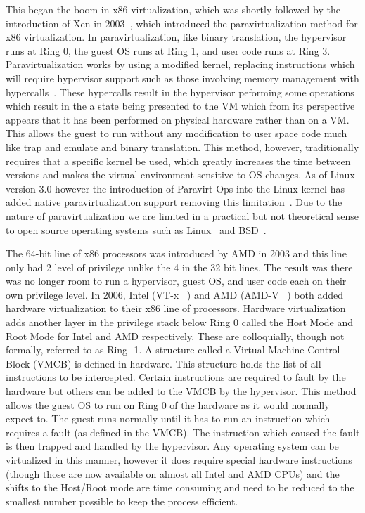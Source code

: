This began the boom in x86 virtualization, which was shortly followed by the introduction of Xen in 2003~\cite{barham_xen_2003}, which introduced the paravirtualization method for x86 virtualization. In paravirtualization, like binary translation, the hypervisor runs at Ring 0, the guest OS runs at Ring 1, and user code runs at Ring 3.  Paravirtualization works by using a modified kernel, replacing instructions which will require hypervisor support such as those involving memory management with hypercalls~\cite{barham_xen_2003}.  These hypercalls result in the hypervisor peforming some operations which result in the a state being presented to the VM which from its perspective appears that it has been performed on physical hardware rather than on a VM. This allows the guest to run without any modification to user space code much like trap and emulate and binary translation. This method, however, traditionally requires that a specific kernel be used, which greatly increases the time between versions and makes the virtual environment sensitive to OS changes. As of Linux version 3.0 however the introduction of Paravirt Ops into the Linux kernel has added native paravirtualization support removing this limitation~\cite{_understanding_????}. Due to the nature of paravirtualization we are limited in a practical but not theoretical sense to open source operating systems such as Linux~\cite{_Linux_archive} and BSD~\cite{mckusick_design_2004}.

The 64-bit line of x86 processors was introduced by AMD in 2003 and this line only had 2 level of privilege unlike the 4 in the 32 bit lines. The result was there was no longer room to run a hypervisor, guest OS, and user code each on their own privilege level. In 2006, Intel (VT-x ~\cite{neiger_intel_2006}) and AMD (AMD-V ~\cite{codenamed_pacifica_2005}) both added hardware virtualization to their x86 line of processors. Hardware virtualization adds another layer in the privilege stack below Ring 0 called the Host Mode and Root Mode for Intel and AMD respectively. These are colloquially, though not formally, referred to as Ring -1. A structure called a Virtual Machine Control Block (VMCB) is defined in hardware. This structure holds the list of all instructions to be intercepted. Certain instructions are required to fault by the hardware but others can be added to the VMCB by the hypervisor. This method allows the guest OS to run on Ring 0 of the hardware as it would normally expect to. The guest runs normally until it has to run an instruction which requires a fault (as defined in the VMCB). The instruction which caused the fault is then trapped and handled by the hypervisor. Any operating system can be virtualized in this manner, however it does require special hardware instructions (though those are now available on almost all Intel and AMD CPUs) and the shifts to the Host/Root mode are time consuming and need to be reduced to the smallest number possible to keep the process efficient.


